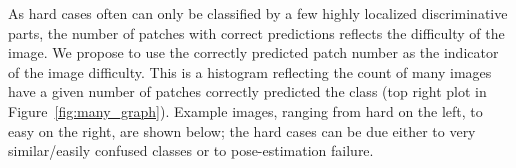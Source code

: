 \begin{comment}
We also identify hard cases by patch score.
If an image can be classified correctly by most of its patches,
then it belongs to the easy category.
Otherwise, it belongs to hard case category. 
The image difficulty distribution is shown in Figure ~\ref{fig:image_difficult}. This figure also provides sample images ranging from hard to easy. Note the increasingly cluttered background towards the difficult end.
\end{comment}

As hard cases often can only be classified by a few highly localized discriminative parts, the number of patches with correct predictions reflects the difficulty of the image. We propose to use the correctly predicted patch number as the indicator of the image difficulty. This is a histogram reflecting the count of many images have a given number of patches correctly predicted the class (top right plot in Figure~\ref{fig:many_graph}). Example images, ranging from hard on the left, to easy on the right, are shown below; the hard cases can be due either to very similar/easily confused classes or to pose-estimation failure.

\begin{comment}
\subsection{Patch Size Study} \label{sec:patch-size}
\pei{Patch size is an important hyper parameter in our experiment. 
To study its affect on the patch classifier accuracy, 
we choose the \patchpair{crown}{left-leg} patch and run ResNet-50 on 4 different sizes of input. 
Results are shown in Table~\ref{patch-size-table}
We find generally larger patch will get better accuracy score. 
We choose 256  512 also because our ResNet-50 models are pretrained on such resolution on ImageNet dataset.}
\end{comment}




